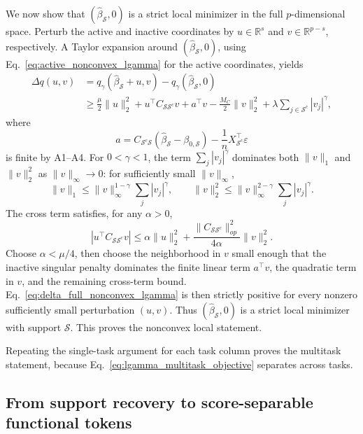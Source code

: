 \documentclass{article}
\begin{document}
We now show that \((\widehat\beta_{\mathcal S},0)\) is a strict local minimizer in the full \(p\)-dimensional space. Perturb the active and inactive coordinates by \(u\in\mathbb R^s\) and \(v\in\mathbb R^{p-s}\), respectively. A Taylor expansion around \((\widehat\beta_{\mathcal S},0)\), using Eq.~\eqref{eq:active_nonconvex_lgamma} for the active coordinates, yields
\begin{align}
\Delta q(u,v)
&=
q_\gamma(\widehat\beta_{\mathcal S}+u,v)-q_\gamma(\widehat\beta_{\mathcal S},0) \\
&\ge
\frac{\mu}{2}\|u\|_2^2
+
 u^\top C_{\mathcal S\mathcal S^c}v
+
 a^\top v
-
\frac{M_C}{2}\|v\|_2^2
+
\lambda\sum_{j\in\mathcal S^c}|v_j|^\gamma,
\label{eq:delta_full_nonconvex_lgamma}
\end{align}
where
\begin{equation}
a=
C_{\mathcal S^c\mathcal S}(\widehat\beta_{\mathcal S}-\beta_{0,\mathcal S})
-
\frac{1}{n}X_{\mathcal S^c}^\top\varepsilon
\end{equation}
is finite by A1--A4. For \(0<\gamma<1\), the term \(\sum_j|v_j|^\gamma\) dominates both \(\|v\|_1\) and \(\|v\|_2^2\) as \(\|v\|_\infty\to0\): for sufficiently small \(\|v\|_\infty\),
\begin{equation}
\|v\|_1\le \|v\|_\infty^{1-\gamma}\sum_j|v_j|^\gamma,
\qquad
\|v\|_2^2\le \|v\|_\infty^{2-\gamma}\sum_j|v_j|^\gamma .
\end{equation}
The cross term satisfies, for any \(\alpha>0\),
\begin{equation}
|u^\top C_{\mathcal S\mathcal S^c}v|
\le
\alpha\|u\|_2^2+
\frac{\|C_{\mathcal S\mathcal S^c}\|_{op}^2}{4\alpha}\|v\|_2^2 .
\end{equation}
Choose \(\alpha<\mu/4\), then choose the neighborhood in \(v\) small enough that the inactive singular penalty dominates the finite linear term \(a^\top v\), the quadratic term in \(v\), and the remaining cross-term bound. Eq.~\eqref{eq:delta_full_nonconvex_lgamma} is then strictly positive for every nonzero sufficiently small perturbation \((u,v)\). Thus \((\widehat\beta_{\mathcal S},0)\) is a strict local minimizer with support \(\mathcal S\). This proves the nonconvex local statement.

Repeating the single-task argument for each task column proves the multitask statement, because Eq.~\eqref{eq:lgamma_multitask_objective} separates across tasks.

\subsection{From support recovery to score-separable functional tokens}
\end{document}
